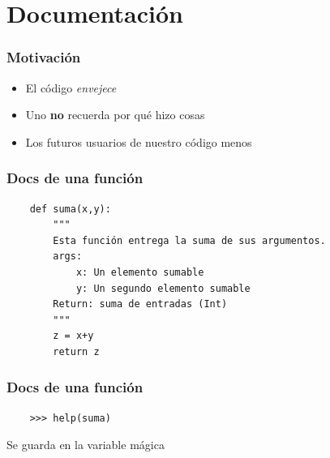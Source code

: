 \documentclass[14pt,aspectratio=169,xcolor=dvipsnames]{beamer}
\begin{document}
\section{Documentación}
\begin{frame}\frametitle{Motivación}
    \begin{itemize}
        \item El código \emph{envejece}
        \item Uno \textbf{no} recuerda por qué hizo cosas
        \item Los futuros usuarios de nuestro código \huge{menos}
    \end{itemize}
\end{frame}
\begin{frame}[fragile]\frametitle{Docs de una función}
    \begin{verbatim}
    def suma(x,y):
        """
        Esta función entrega la suma de sus argumentos. 
        args: 
            x: Un elemento sumable
            y: Un segundo elemento sumable
        Return: suma de entradas (Int)
        """
        z = x+y
        return z
    \end{verbatim}
\end{frame}
\begin{frame}[fragile]\frametitle{Docs de una función}
    \begin{verbatim}
    >>> help(suma)
    \end{verbatim}

    \vspace{1cm}
    Se guarda en la variable mágica 

\end{frame}
\end{document}
